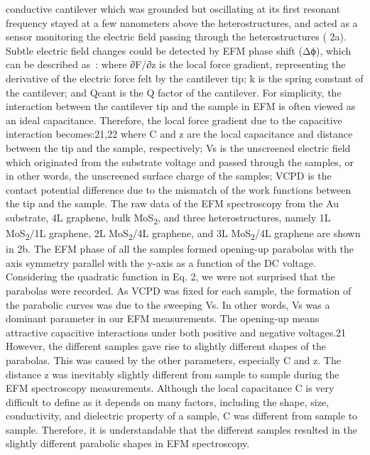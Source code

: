 conductive cantilever which was grounded but oscillating at its first
resonant frequency stayed at a few nanometers above the
heterostructures, and acted as a sensor monitoring the electric field
passing through the heterostructures ( 2a). Subtle electric
field changes could be detected by EFM phase shift (Δϕ), which can be
described as~\cite{Li_2014_screen}:
where ∂F/∂z is the local force gradient, representing the derivative of the electric force felt by the cantilever tip; k is the spring constant of the cantilever; and Qcant is the Q factor of the cantilever. For simplicity, the interaction between the cantilever tip and the sample in EFM is often viewed as an ideal capacitance. Therefore, the local force gradient due to the capacitive interaction becomes:21,22
where C and z are the local capacitance and distance between the tip and the sample, respectively; Vs is the unscreened electric field which originated from the substrate voltage and passed through the samples, or in other words, the unscreened surface charge of the samples; VCPD is the contact potential difference due to the mismatch of the work functions between the tip and the sample. The raw data of the EFM spectroscopy from the Au substrate, 4L graphene, bulk MoS\textsubscript{2}, and three heterostructures, namely 1L MoS\textsubscript{2}/1L graphene, 2L MoS\textsubscript{2}/4L graphene, and 3L MoS\textsubscript{2}/4L graphene are shown in  2b. The EFM phase of all the samples formed opening-up parabolas with the axis symmetry parallel with the y-axis as a function of the DC voltage. Considering the quadratic function in Eq. 2, we were not surprised that the parabolas were recorded. As VCPD was fixed for each sample, the formation of the parabolic curves was due to the sweeping Vs. In other words, Vs was a dominant parameter in our EFM measurements. The opening-up means attractive capacitive interactions under both positive and negative voltages.21 However, the different samples gave rise to slightly different shapes of the parabolas. This was caused by the other parameters, especially C and z. The distance z was inevitably slightly different from sample to sample during the EFM spectroscopy measurements. Although the local capacitance C is very difficult to define as it depends on many factors, including the shape, size, conductivity, and dielectric property of a sample, C was different from sample to sample. Therefore, it is understandable that the different samples resulted in the slightly different parabolic shapes in EFM spectroscopy. 
